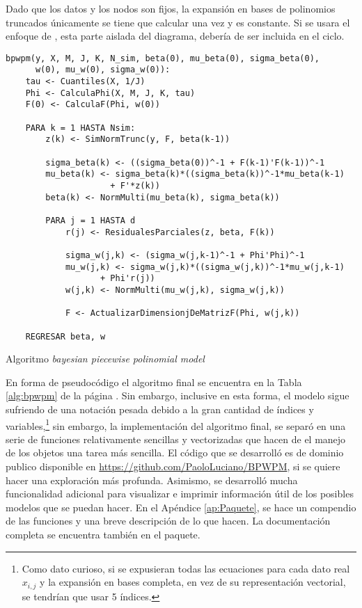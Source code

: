 \documentclass[../Main/Main.tex]{subfiles}
\begin{document}
Dado que los datos y los nodos son fijos, la expansión en bases de polinomios truncados únicamente se tiene que calcular una vez y es constante. Si se usara el enfoque de \citet{mallik1998automatic}, esta parte aislada del diagrama, debería de ser incluida en el ciclo.

\begin{table}[p]
\makebox[\linewidth]{\rule{\textwidth}{0.4pt}}
\begin{verbatim}
bpwpm(y, X, M, J, K, N_sim, beta(0), mu_beta(0), sigma_beta(0), 
	  w(0), mu_w(0), sigma_w(0)):    
    tau <- Cuantiles(X, 1/J)
    Phi <- CalculaPhi(X, M, J, K, tau)
    F(0) <- CalculaF(Phi, w(0))
        
    PARA k = 1 HASTA Nsim:
        z(k) <- SimNormTrunc(y, F, beta(k-1))
            
        sigma_beta(k) <- ((sigma_beta(0))^-1 + F(k-1)'F(k-1))^-1
        mu_beta(k) <- sigma_beta(k)*((sigma_beta(k))^-1*mu_beta(k-1) 
                     + F'*z(k))
        beta(k) <- NormMulti(mu_beta(k), sigma_beta(k)) 
            
        PARA j = 1 HASTA d
            r(j) <- ResidualesParciales(z, beta, F(k))
                
            sigma_w(j,k) <- (sigma_w(j,k-1)^-1 + Phi'Phi)^-1
            mu_w(j,k) <- sigma_w(j,k)*((sigma_w(j,k))^-1*mu_w(j,k-1) 
                   + Phi'r(j))
            w(j,k) <- NormMulti(mu_w(j,k), sigma_w(j,k)) 
            
            F <- ActualizarDimensionjDeMatrizF(Phi, w(j,k))    
            
    REGRESAR beta, w
\end{verbatim} 
\makebox[\linewidth]{\rule{\textwidth}{0.4pt}}
\caption{Algoritmo \textit{bayesian piecewise polinomial model}}
\label{alg:bpwpm}
\end{table}

En forma de pseudocódigo el algoritmo final se encuentra en la Tabla \ref{alg:bpwpm} de la página \pageref{alg:bpwpm}. Sin embargo, inclusive en esta forma, el modelo sigue sufriendo de una notación pesada debido a la gran cantidad de índices y variables,\footnote{Como dato curioso, si se expusieran todas las ecuaciones para cada dato real $x_{i,j}$ y la expansión en bases completa, en vez de su representación vectorial, se tendrían que usar 5 índices.} sin embargo, la implementación del algoritmo final, se separó en una serie de funciones relativamente sencillas y vectorizadas que hacen de el manejo de los objetos una tarea más sencilla. El código que se desarrolló es de dominio publico disponible en \url{https://github.com/PaoloLuciano/BPWPM}, si se quiere hacer una exploración más profunda. Asimismo, se desarrolló mucha funcionalidad adicional para visualizar e imprimir información útil de los posibles modelos que se puedan hacer. En el Apéndice \ref{ap:Paquete}, se hace un compendio de las funciones y una breve descripción de lo que hacen. La documentación completa se encuentra también en el paquete.
\end{document}

